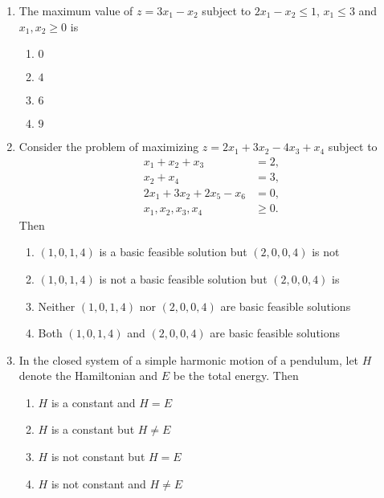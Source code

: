 \documentclass[journal,12pt,onecolumn]{IEEEtran}
\theoremstyle{remark}
\begin{document}
\begin{enumerate}
\item The maximum value of $z = 3x_1 - x_2$ subject to $2x_1 - x_2 \leq 1$, $x_1 \leq 3$ and $x_1, x_2 \geq 0$ is  
\\[-0.3em]\makebox[\textwidth][r]{\textit{[GATE EE 2025]}}

\begin{enumerate}[label=(\Alph*)]
\item $0$
\item $4$
\item $6$
\item $9$
\end{enumerate}

\item Consider the problem of maximizing $z = 2x_1 + 3x_2 - 4x_3 + x_4$ subject to  
\begin{align*}
x_1 + x_2 + x_3 &= 2, \\
x_2 + x_4 &= 3, \\
2x_1 + 3x_2 + 2x_5 - x_6 &= 0, \\
x_1, x_2, x_3, x_4 &\ge 0.
\end{align*}
Then  
\\[-0.3em]\makebox[\textwidth][r]{\textit{[GATE EE 2025]}}

\begin{enumerate}[label=(\Alph*)]
\item $(1,0,1,4)$ is a basic feasible solution but $(2,0,0,4)$ is not
\item $(1,0,1,4)$ is not a basic feasible solution but $(2,0,0,4)$ is
\item Neither $(1,0,1,4)$ nor $(2,0,0,4)$ are basic feasible solutions
\item Both $(1,0,1,4)$ and $(2,0,0,4)$ are basic feasible solutions
\end{enumerate}

\item In the closed system of a simple harmonic motion of a pendulum, let $H$ denote the Hamiltonian and $E$ be the total energy. Then  
\\[-0.3em]\makebox[\textwidth][r]{\textit{[GATE EE 2025]}}

\begin{enumerate}[label=(\Alph*)]
\item $H$ is a constant and $H = E$
\item $H$ is a constant but $H \ne E$
\item $H$ is not constant but $H = E$
\item $H$ is not constant and $H \ne E$
\end{enumerate}


\end{enumerate}
\end{document}
